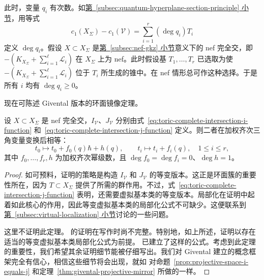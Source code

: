 此时，变量 $q_i$ 有次数。如\hyperref[subsec:quantum-hyperplane-section-principle]{第~\ref*{subsec:quantum-hyperplane-section-principle} 小节}，用等式
\[
c_1(X_\Sigma)-c_1(\mathcal V)=\sum_{i=1}^r(\deg q_i)T_i
\]
定义 $\deg q_i$。假设 $X\subset X_\Sigma$ 是\hyperref[subsec:nef-gkz]{第~\ref*{subsec:nef-gkz} 小节}意义下的 nef 完全交，即 $-(K_{X_\Sigma}+\sum_{i=1}^{\ell}\mathcal L_i)$ 在 $X_\Sigma$ 上为 nef。此时假设基 $T_1,\ldots,T_r$ 已选取为使
$-(K_{X_\Sigma}+\sum_{i=1}^{\ell}\mathcal L_i)$ 位于 $T_i$ 所生成的锥中。在 nef 情形总可作这种选择。于是所有 $i$ 均有 $\deg q_i\ge0$。

现在可陈述 Givental 版本的环面镜像定理。
\begin{theorem}\label{thm:givental-toric-mirror}
设 $X\subset X_\Sigma$ 是 nef 完全交，$I_{\mathcal V}$、$J_{\mathcal V}$ 分别由式~\eqref{eq:toric-complete-intersection-i-function} 和~\eqref{eq:toric-complete-intersection-j-function} 定义。则二者在加权齐次三角变量变换后相等：
\[
t_0\longmapsto t_0+f_0(q)\hbar+h(q),\qquad t_i\longmapsto t_i+f_i(q),\quad1\le i\le r,
\]
其中 $f_0,\ldots,f_r,h$ 为加权齐次幂级数，且 $\deg f_0=\deg f_i=0$、$\deg h=1$。
\end{theorem}
\begin{proof}
如可预料，证明的策略是构造 $I_{\mathcal V}$ 和 $J_{\mathcal V}$ 的等变版本。这正是环面簇的重要性所在，因为 $T\subset X_\Sigma$ 提供了所需的群作用。不过，式~\eqref{eq:toric-complete-intersection-j-function} 表明，还需要虚拟基本类的等变版本。局部化在证明中起着如此核心的作用，因此等变虚拟基本类的局部化公式不可缺少。这便联系到\hyperref[subsec:virtual-localization]{第~\ref*{subsec:virtual-localization} 小节}讨论的一些问题。

这里不证明此定理。 的证明在写作时尚不完整。特别地，如上所述，证明以存在适当的等变虚拟基本类局部化公式为前提。 已建立了这样的公式。考虑到此定理的重要性，我们希望其余证明细节能被仔细写出。我们对 Givental 建立的概念框架完全有信心，相信这些细节将会出现，就如  对命题~\ref{prop:projective-space-i-equals-j} 和定理~\ref{thm:givental-projective-mirror} 所做的一样。
\end{proof}
